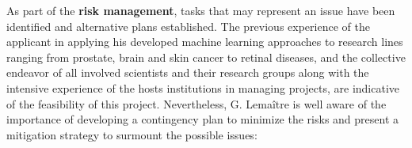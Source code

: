 As part of the \textbf{risk management}, tasks that may represent an issue have been identified and alternative plans established. 
The previous experience of the applicant in applying his developed machine learning approaches to research lines ranging from prostate, brain and skin cancer to retinal diseases, and the collective endeavor of all involved scientists and their research groups along with the intensive experience of the hosts institutions in managing projects, are indicative of the feasibility of this project. 
Nevertheless, G. Lema\^itre is well aware of the importance of developing a contingency plan to minimize the risks and present a mitigation strategy to surmount the possible issues:
